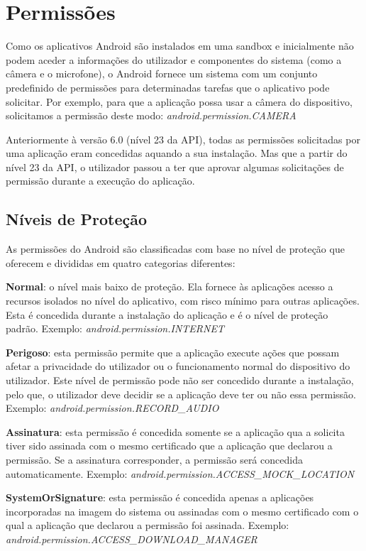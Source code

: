 \section{Permissões}
Como os aplicativos Android são instalados em uma sandbox e inicialmente não podem aceder a informações do utilizador e componentes do sistema (como a câmera e o microfone), o Android fornece um sistema com um conjunto predefinido de permissões para determinadas tarefas que o aplicativo pode solicitar. 
Por exemplo, para que a aplicação possa usar a câmera do dispositivo, solicitamos a permissão deste modo: \textit{android.permission.CAMERA}

Anteriormente à versão 6.0 (nível 23 da API), todas as permissões solicitadas por uma aplicação eram concedidas aquando a sua instalação. Mas que a partir do nível 23 da API, o utilizador passou a ter que aprovar algumas solicitações de permissão durante a execução do aplicação.


\subsection{Níveis de Proteção}
As permissões do Android são classificadas com base no nível de proteção que oferecem e divididas em quatro categorias diferentes:

\textbf{Normal}: o nível mais baixo de proteção. Ela fornece às aplicações acesso a recursos isolados no nível do aplicativo, com risco mínimo para outras aplicações. Esta é concedida durante a instalação do aplicação e é o nível de proteção padrão.
Exemplo: \textit{android.permission.INTERNET}

\textbf{Perigoso}: esta permissão permite que a aplicação execute ações que possam afetar a privacidade do utilizador ou o funcionamento normal do dispositivo do utilizador. Este nível de permissão pode não ser concedido durante a instalação, pelo que, o utilizador deve decidir se a aplicação deve ter ou não essa permissão.
Exemplo: \textit{android.permission.RECORD\_AUDIO}

\textbf{Assinatura}: esta permissão é concedida somente se a aplicação qua a solicita tiver sido assinada com o mesmo certificado que a aplicação que declarou a permissão. Se a assinatura corresponder, a permissão será concedida automaticamente.
Exemplo: \textit{android.permission.ACCESS\_MOCK\_LOCATION}

\textbf{SystemOrSignature}: esta permissão é concedida apenas a aplicações incorporadas na imagem do sistema ou assinadas com o mesmo certificado com o qual a aplicação que declarou a permissão foi assinada.
Exemplo: \textit{android.permission.ACCESS\_DOWNLOAD\_MANAGER}


